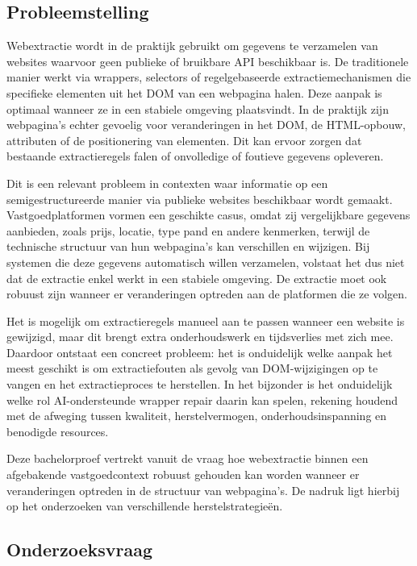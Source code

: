 \subsection{Probleemstelling}
\label{subsec:probleemstelling}

Webextractie wordt in de praktijk gebruikt om gegevens te verzamelen van websites waarvoor geen publieke of bruikbare API beschikbaar is. De traditionele manier werkt via wrappers, selectors of regelgebaseerde extractiemechanismen die specifieke elementen uit het DOM van een webpagina halen. Deze aanpak is optimaal wanneer ze in een stabiele omgeving plaatsvindt. In de praktijk zijn webpagina’s echter gevoelig voor veranderingen in het DOM, de HTML-opbouw, attributen of de positionering van elementen. Dit kan ervoor zorgen dat bestaande extractieregels falen of onvolledige of foutieve gegevens opleveren.

Dit is een relevant probleem in contexten waar informatie op een semigestructureerde manier via publieke websites beschikbaar wordt gemaakt. Vastgoedplatformen vormen een geschikte casus, omdat zij vergelijkbare gegevens aanbieden, zoals prijs, locatie, type pand en andere kenmerken, terwijl de technische structuur van hun webpagina’s kan verschillen en wijzigen. Bij systemen die deze gegevens automatisch willen verzamelen, volstaat het dus niet dat de extractie enkel werkt in een stabiele omgeving. De extractie moet ook robuust zijn wanneer er veranderingen optreden aan de platformen die ze volgen.

Het is mogelijk om extractieregels manueel aan te passen wanneer een website is gewijzigd, maar dit brengt extra onderhoudswerk en tijdsverlies met zich mee. Daardoor ontstaat een concreet probleem: het is onduidelijk welke aanpak het meest geschikt is om extractiefouten als gevolg van DOM-wijzigingen op te vangen en het extractieproces te herstellen. In het bijzonder is het onduidelijk welke rol AI-ondersteunde wrapper repair daarin kan spelen, rekening houdend met de afweging tussen kwaliteit, herstelvermogen, onderhoudsinspanning en benodigde resources.

Deze bachelorproef vertrekt vanuit de vraag hoe webextractie binnen een afgebakende vastgoedcontext robuust gehouden kan worden wanneer er veranderingen optreden in de structuur van webpagina’s. De nadruk ligt hierbij op het onderzoeken van verschillende herstelstrategieën.

\subsection{Onderzoeksvraag}
\label{subsec:onderzoeksvraag}

